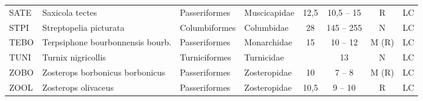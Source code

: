 \begin{table}
\begin{tabular}{|llllcccc|}
SATE & Saxicola tectes & Passeriformes & Muscicapidae & 12,5 & 10,5 – 15 & R  & LC \\ 
STPI & Streptopelia picturata & Columbiformes & Columbidae & 28 & 145 – 255 & N & LC  \\ 
TEBO & Terpsiphone bourbonnensis bourb. & Passeriformes & Monarchidae & 15 & 10 – 12 & M (R)  & LC \\ 
TUNI & Turnix nigricollis & Turniciformes & Turnicidae &  & 13 & N & LC  \\ 
ZOBO & Zosterops borbonicus borbonicus & Passeriformes & Zosteropidae & 10 & 7 – 8 & M (R)  & LC \\ 
ZOOL & Zosterops olivaceus & Passeriformes & Zosteropidae & 10,5 & 9 – 10 & R  & LC \\ 
\bottomrule
\end{tabular}
\end{table}
